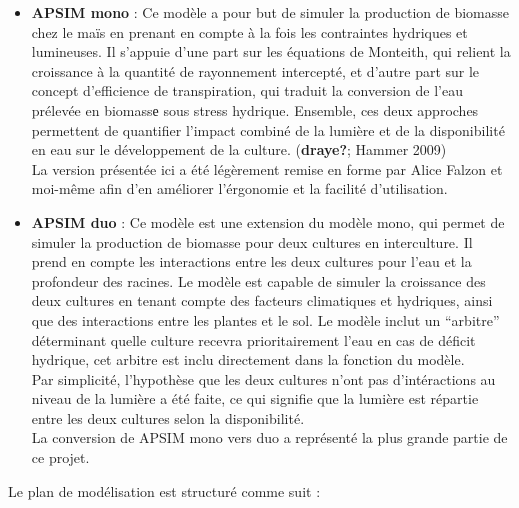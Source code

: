 \documentclass[
]{article}
\begin{document}
\begin{itemize}
\item
  \textbf{APSIM mono} : Ce modèle a pour but de simuler la production de
  biomasse chez le maïs en prenant en compte à la fois les contraintes
  hydriques et lumineuses. Il s'appuie d'une part sur les équations de
  Monteith, qui relient la croissance à la quantité de rayonnement
  intercepté, et d'autre part sur le concept d'efficience de
  transpiration, qui traduit la conversion de l'eau prélevée en biomassе
  sous stress hydrique. Ensemble, ces deux approches permettent de
  quantifier l'impact combiné de la lumière et de la disponibilité en
  eau sur le développement de la culture. (\textbf{draye?}; Hammer
  2009)\\
  La version présentée ici a été légèrement remise en forme par Alice
  Falzon et moi-même afin d'en améliorer l'érgonomie et la facilité
  d'utilisation.
\item
  \textbf{APSIM duo} : Ce modèle est une extension du modèle mono, qui
  permet de simuler la production de biomasse pour deux cultures en
  interculture. Il prend en compte les interactions entre les deux
  cultures pour l'eau et la profondeur des racines. Le modèle est
  capable de simuler la croissance des deux cultures en tenant compte
  des facteurs climatiques et hydriques, ainsi que des interactions
  entre les plantes et le sol. Le modèle inclut un ``arbitre''
  déterminant quelle culture recevra prioritairement l'eau en cas de
  déficit hydrique, cet arbitre est inclu directement dans la fonction
  du modèle.\\
  Par simplicité, l'hypothèse que les deux cultures n'ont pas
  d'intéractions au niveau de la lumière a été faite, ce qui signifie
  que la lumière est répartie entre les deux cultures selon la
  disponibilité.\\
  La conversion de APSIM mono vers duo a représenté la plus grande
  partie de ce projet.
\end{itemize}

Le plan de modélisation est structuré comme suit :
\end{document}
